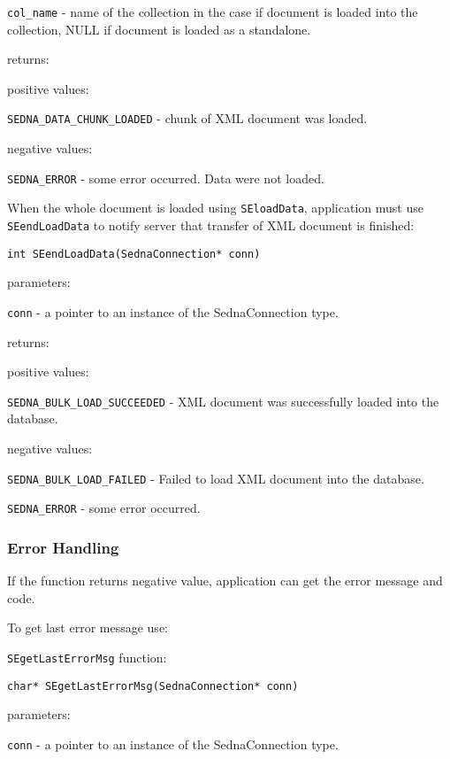 \documentclass[a4paper,12pt]{article}
\begin{document}
\verb!col_name! - name of the collection in the case if document is loaded into the collection, NULL if document is loaded as a standalone.

returns:

positive values:

\verb!SEDNA_DATA_CHUNK_LOADED! - chunk of XML document was loaded.

negative values:

\verb!SEDNA_ERROR! - some error occurred. Data were not loaded.

When the whole document is loaded using \verb!SEloadData!, application must use \verb!SEendLoadData! to notify server that  transfer of XML document is finished:

\begin{verbatim}int SEendLoadData(SednaConnection* conn)\end{verbatim}

parameters:

\verb!conn! - a pointer to an instance of the SednaConnection type.

returns:

positive values:

\verb!SEDNA_BULK_LOAD_SUCCEEDED! - XML document was successfully loaded into the database.

negative values:

\verb!SEDNA_BULK_LOAD_FAILED! - Failed to load XML document into the database.

\verb!SEDNA_ERROR! - some error occurred.







\subsubsection{Error Handling}

If the function returns negative value, application can get the error message and code.


To get last error message use:

\verb!SEgetLastErrorMsg! function:

\begin{verbatim}char* SEgetLastErrorMsg(SednaConnection* conn)\end{verbatim}

parameters:

\verb!conn! - a pointer to an instance of the SednaConnection type.
\end{document}
